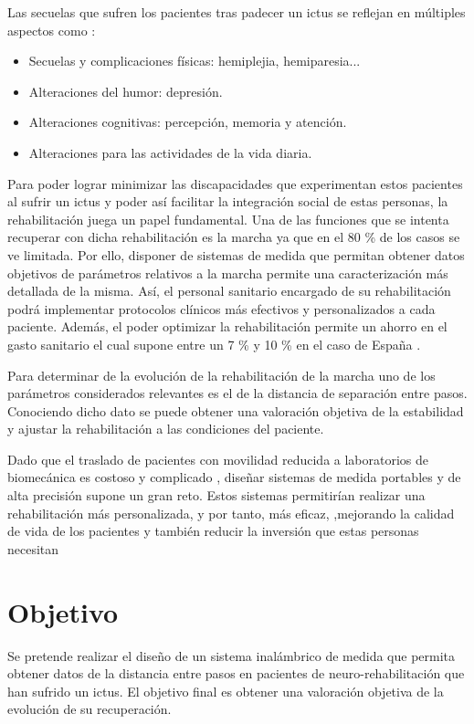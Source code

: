 Las secuelas que sufren los pacientes tras padecer un ictus se reflejan en múltiples aspectos como \cite{secuelas} :
\begin{itemize}
	\item Secuelas y complicaciones físicas: hemiplejia, hemiparesia...
	\item Alteraciones del humor: depresión.
	\item Alteraciones cognitivas: percepción, memoria y atención.
	\item Alteraciones para las actividades de la vida diaria.
\end{itemize}

Para poder lograr minimizar las discapacidades que experimentan estos pacientes al sufrir un ictus y poder así facilitar la integración social de estas personas, la rehabilitación juega un papel fundamental. Una de las funciones que se intenta recuperar con dicha rehabilitación es la marcha ya que en el 80 \% de los casos se ve limitada. Por ello, disponer de sistemas de medida que permitan obtener datos objetivos de parámetros relativos a la marcha permite una caracterización más detallada de la misma. Así, el personal sanitario encargado de su rehabilitación podrá implementar protocolos clínicos más efectivos y personalizados a cada paciente. Además, el poder optimizar la rehabilitación permite un ahorro en el gasto sanitario el cual supone entre un 7 \% y 10 \% en el caso de España \cite{gasto}.

Para determinar de la evolución de la rehabilitación de la marcha uno de los parámetros considerados relevantes es el de la distancia de separación entre pasos. Conociendo dicho dato se puede obtener una valoración objetiva de la estabilidad y ajustar la rehabilitación a las condiciones del paciente.

Dado que el traslado de pacientes con movilidad reducida a laboratorios de biomecánica es costoso y complicado \cite{gasto}, diseñar sistemas de medida portables y de alta precisión supone un gran reto. Estos sistemas permitirían realizar una rehabilitación más personalizada, y por tanto, más eficaz, ,mejorando la calidad de vida de los pacientes y también reducir la inversión que estas personas necesitan





\section{Objetivo}\label{sec:objetivos}
Se pretende realizar el diseño de un sistema inalámbrico de medida que permita obtener datos de la distancia entre pasos en pacientes de neuro-rehabilitación que han sufrido un ictus. El objetivo final es obtener una valoración objetiva de la evolución de su recuperación.

